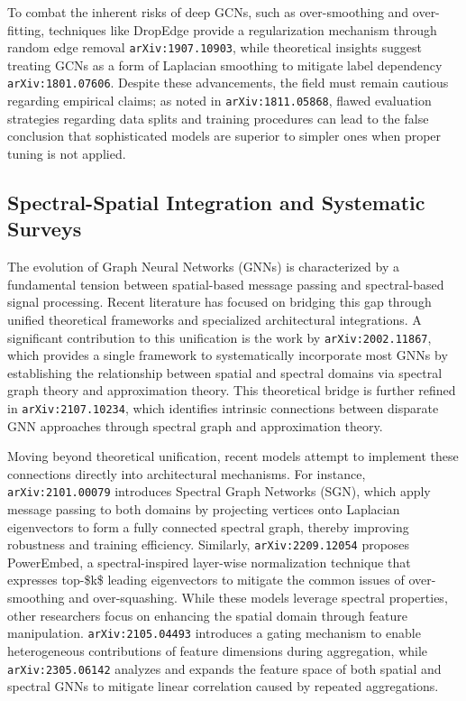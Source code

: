 \documentclass[11pt]{article}
\begin{document}
To combat the inherent risks of deep GCNs, such as over-smoothing and over-fitting, techniques like DropEdge provide a regularization mechanism through random edge removal \texttt{arXiv:1907.10903}, while theoretical insights suggest treating GCNs as a form of Laplacian smoothing to mitigate label dependency \texttt{arXiv:1801.07606}. Despite these advancements, the field must remain cautious regarding empirical claims; as noted in \texttt{arXiv:1811.05868}, flawed evaluation strategies regarding data splits and training procedures can lead to the false conclusion that sophisticated models are superior to simpler ones when proper tuning is not applied.

\subsection{Spectral-Spatial Integration and Systematic Surveys}

The evolution of Graph Neural Networks (GNNs) is characterized by a fundamental tension between spatial-based message passing and spectral-based signal processing. Recent literature has focused on bridging this gap through unified theoretical frameworks and specialized architectural integrations. A significant contribution to this unification is the work by \texttt{arXiv:2002.11867}, which provides a single framework to systematically incorporate most GNNs by establishing the relationship between spatial and spectral domains via spectral graph theory and approximation theory. This theoretical bridge is further refined in \texttt{arXiv:2107.10234}, which identifies intrinsic connections between disparate GNN approaches through spectral graph and approximation theory.

Moving beyond theoretical unification, recent models attempt to implement these connections directly into architectural mechanisms. For instance, \texttt{arXiv:2101.00079} introduces Spectral Graph Networks (SGN), which apply message passing to both domains by projecting vertices onto Laplacian eigenvectors to form a fully connected spectral graph, thereby improving robustness and training efficiency. Similarly, \texttt{arXiv:2209.12054} proposes PowerEmbed, a spectral-inspired layer-wise normalization technique that expresses top-\$k\$ leading eigenvectors to mitigate the common issues of over-smoothing and over-squashing. While these models leverage spectral properties, other researchers focus on enhancing the spatial domain through feature manipulation. \texttt{arXiv:2105.04493} introduces a gating mechanism to enable heterogeneous contributions of feature dimensions during aggregation, while \texttt{arXiv:2305.06142} analyzes and expands the feature space of both spatial and spectral GNNs to mitigate linear correlation caused by repeated aggregations.
\end{document}
